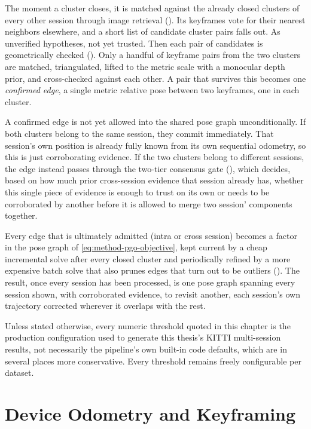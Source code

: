 The moment a cluster closes, it is matched against the already closed clusters of every other session through image retrieval (). Its keyframes vote
for their nearest neighbors elsewhere, and a short list of candidate cluster pairs falls out. As unverified hypotheses, not yet trusted. Then each pair of candidates is geometrically checked (). Only a handful of keyframe pairs from the two clusters are matched, triangulated, lifted to the metric scale with a monocular depth prior, and cross-checked against each other. A pair that survives this becomes one \emph{confirmed edge}, a single metric relative pose between two keyframes, one in each cluster.

A confirmed edge is not yet allowed into the shared pose graph unconditionally. If both
clusters belong to the same session, they commit immediately. That session's own position
is already fully known from its own sequential odometry, so this is just corroborating
evidence. If the two clusters belong to different sessions, the edge instead passes through
the two-tier consensus gate (), which decides, based on how much
prior cross-session evidence that session already has, whether this single piece of evidence
is enough to trust on its own or needs to be corroborated by another before it is allowed to
merge two session' components together.

Every edge that is ultimately admitted (intra or cross session) becomes a factor in the
pose graph of \eqref{eq:method-pgo-objective}, kept current by a cheap incremental solve after
every closed cluster and periodically refined by a more expensive batch solve that also prunes
edges that turn out to be outliers (). The result, once every
session has been processed, is one pose graph spanning every session shown, with corroborated
evidence, to revisit another, each session's own trajectory corrected wherever it overlaps
with the rest.


Unless stated otherwise, every numeric threshold quoted in this chapter is the production configuration used to generate this thesis's KITTI multi-session results, not necessarily the pipeline's own built-in code defaults, which are in several places more conservative. Every threshold remains freely configurable per dataset.

\section{Device Odometry and Keyframing} 
\label{sec:method-odometry}

